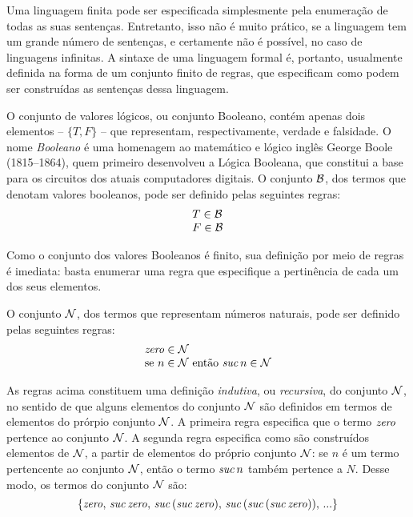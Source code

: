 Uma linguagem finita pode ser especificada simplesmente pela enumera\c{c}\~ao de todas as suas  sentenças. Entretanto, isso não é muito prático, se a linguagem tem um grande número de sentenças, e certamente não é possível, no caso de linguagens infinitas. A sintaxe de uma linguagem formal é, portanto, usualmente definida na forma de um conjunto finito de regras, que especificam como podem ser construídas as sentenças dessa linguagem.


\begin{Definition}
  O conjunto de valores lógicos, ou conjunto Booleano, contém apenas dois elementos -- $\{T,F\}$ -- que representam, respectivamente, verdade e falsidade. O nome \emph{Booleano} é uma homenagem ao matemático e lógico inglês George Boole  (1815--1864), quem primeiro desenvolveu a Lógica Booleana, que constitui a base para os circuitos dos atuais computadores digitais. O conjunto $\mathcal{B}$, dos termos que denotam valores booleanos, pode ser definido pelas seguintes regras:
  \[
      \begin{array}{l}
        T \in\mathcal{B}\\
        F \in\mathcal{B}
      \end{array}
  \]
\end{Definition}

Como o conjunto dos valores Booleanos \'e finito, sua defini\c{c}\~ao por meio de regras \'e imediata: basta enumerar uma regra que especifique a pertinência de cada um dos seus elementos.

\begin{Definition}\label{def:syn:nat}
O conjunto $\mathcal{N}$, dos termos que representam n\'umeros naturais, pode ser definido pelas seguintes regras:
\[
   \begin{array}{l}
     \textit{zero\/} \in \mathcal{N}\\
     \text{se $n \in \mathcal{N}$ ent\~ao $\textit{suc\/}\, n\in\mathcal{N}$}
   \end{array}
\]
\end{Definition}
As regras acima constituem uma definição \emph{indutiva}, ou \emph{recursiva\/}, do conjunto $\mathcal{N}$, no sentido de que alguns elementos do conjunto $\mathcal{N}$ são definidos em termos de elementos do prórpio conjunto $\mathcal{N}$. A primeira regra especifica que o termo $\textit{zero\/}$ pertence ao conjunto $\mathcal{N}$. A segunda regra especifica como são construídos elementos de $\mathcal{N}$, a partir de elementos do próprio conjunto $\mathcal{N}$:  se $n$ \'e um termo pertencente ao conjunto $\mathcal{N}$, ent\~ao o termo $\textit{suc\/}\,n$ tamb\'em pertence a $N$. Desse modo, os termos do conjunto $\mathcal{N}$ são:
\[ \{\textit{zero\/},\,\textit{suc\/}\,\textit{zero\/},\,\textit{suc\/}\,(\textit{suc\/}\,\textit{zero\/}),\, \textit{suc\/}\,(\textit{suc\/}\,(\textit{suc\/}\,\textit{zero\/})),\,...\} \]

